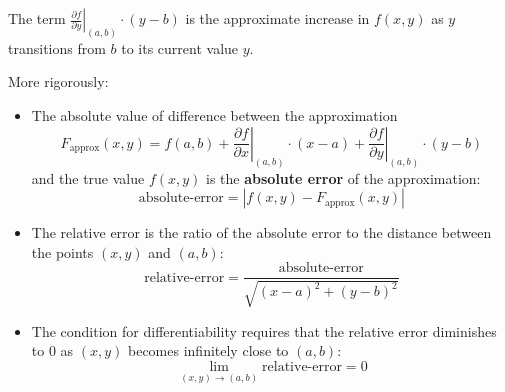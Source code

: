 \documentclass{article}
\begin{document}
The term \(\left.\frac{\partial f}{\partial y}\right|_{(a, b)} \cdot (y - b)\) is the approximate increase in \(f(x, y)\) as \(y\) transitions from \(b\) to its current value \(y\).  

More rigorously: 
\begin{itemize} 
\item The absolute value of difference between the approximation 
\[F_{\text{approx}}(x, y) = f(a, b) + \left.\frac{\partial f}{\partial x}\right|_{(a,b)} \cdot (x - a) + \left.\frac{\partial f}{\partial y}\right|_{(a,b)} \cdot (y - b)\] 
and the true value \(f(x, y)\) is the {\bf absolute error} of the approximation: 
\[\text{absolute-error} = \left|f(x, y) - F_{\text{approx}}(x, y)\right|\]
\item The relative error is the ratio of the absolute error to the distance between the points \((x, y)\) and \((a, b)\):
\[\text{relative-error} = \frac{\text{absolute-error}}{\sqrt{(x - a)^2 + (y - b)^2}}\]
\item The condition for differentiability requires that the relative error diminishes to \(0\) as \((x, y)\) becomes infinitely close to \((a, b)\):
\[\lim_{(x, y) \rightarrow (a, b)} \text{relative-error} = 0\]
\end{itemize}
\end{document}
